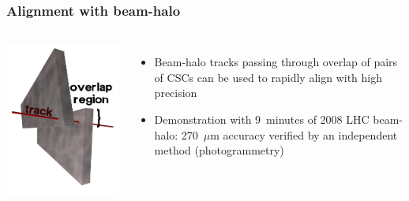 \documentclass[compress]{beamer}
\begin{document}
\begin{frame}
\frametitle{Alignment with beam-halo}

\begin{columns}
\includegraphics[width=\linewidth]{overlaps.png}

\begin{itemize}
\item Beam-halo tracks passing through overlap of pairs of CSCs can be
  used to rapidly align with high precision

\item Demonstration with 9~minutes of 2008 LHC beam-halo: 270~$\mu$m
  accuracy verified by an independent method (photogrammetry)
\end{itemize}
\end{columns}


\end{frame}
\end{document}
